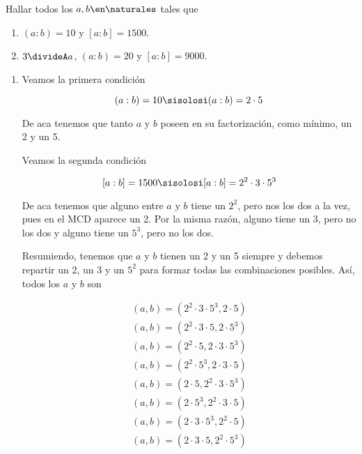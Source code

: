 \begin{enunciado}{\ejercicio}
    Hallar todos los $a,b \en \naturales$ tales que 
    \begin{multicols}{2}
      \begin{enumerate}[label=(\alph*)]
        \item $(a:b)=10$ y $[a:b]=1500$.
        \item $3 \divideA a$, $(a:b)=20$ y $[a:b]=9000$.
      \end{enumerate}
    \end{multicols}
\end{enunciado}

\begin{enumerate}[label=(\alph*)]

    \item 

    Veamos la primera condición

    $$
    (a:b)=10
    \sisolosi
    (a:b)= 2 \cdot 5
    $$

    De aca tenemos que tanto $a$ y $b$ poseen en su factorización, como mínimo, un 2 y un 5. \bigskip

    Veamos la segunda condición

    $$
    [a:b]=1500
    \sisolosi
    [a:b]=2^2 \cdot 3 \cdot 5^3
    $$

    De aca tenemos que alguno entre $a$ y $b$ tiene un $2^2$, pero nos los dos a la vez, pues en el MCD aparece un 2. Por la misma razón,
    alguno tiene un 3, pero no los dos y alguno tiene un $5^3$, pero no los dos. \bigskip

    Resumiendo, tenemos que $a$ y $b$ tienen un 2 y un 5 siempre y debemos repartir un 2, un 3 y un $5^2$ 
    para formar todas las combinaciones posibles. Así, todos los $a$ y $b$ son 

    \begin{align*}
        (a,b)= \boxed{(2^2 \cdot 3 \cdot 5^3 , 2 \cdot 5)} \\
        (a,b)= \boxed{(2^2 \cdot 3 \cdot 5 , 2 \cdot 5^3)} \\
        (a,b)= \boxed{(2^2 \cdot 5 , 2 \cdot 3 \cdot 5^3)} \\
        (a,b)= \boxed{(2^2 \cdot 5^3 , 2 \cdot 3 \cdot 5)} \\
        (a,b)= \boxed{(2 \cdot 5 , 2^2 \cdot 3 \cdot 5^3)} \\
        (a,b)= \boxed{(2 \cdot 5^3 , 2^2 \cdot 3 \cdot 5)} \\
        (a,b)= \boxed{(2 \cdot 3 \cdot 5^3 , 2^2 \cdot 5)} \\
        (a,b)= \boxed{(2 \cdot 3 \cdot 5 , 2^2 \cdot 5^3)} \\
    \end{align*}



\end{enumerate}
